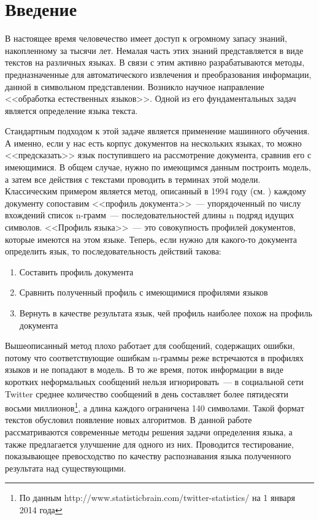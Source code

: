 \documentclass[a4paper, 14pt]{article}
\begin{document}
\pagebreak

\newtheorem{definition} {Определение}
\newtheorem{option} {Свойство}
\newtheorem{theorem} {Теорема}

\section*{Введение}

	        В настоящее время человечество имеет доступ к огромному запасу знаний, накопленному за тысячи лет. Немалая часть этих знаний представляется
	        в виде текстов на различных языках. В связи с этим активно разрабатываются методы, предназначенные для автоматического извлечения
	        и преобразования информации, данной в символьном представлении. 
	        Возникло научное направление <<обработка естественных языков>>. Одной из его фундаментальных задач является определение языка текста. 

	
	        Стандартным подходом к этой задаче является применение машинного обучения. А именно, если у нас есть корпус документов 
	        на нескольких языках, то можно <<предсказать>> язык поступившего на рассмотрение документа, сравнив его с имеющимися. 
	        В общем случае, нужно по имеющимся данным построить модель, а затем все действия с текстами проводить в терминах 
	        этой модели. 
	        Классическим примером является метод, описанный в 1994 году (см. \cite{canvar}) каждому документу сопоставим <<профиль документа>>~--- упорядоченный по
	        числу вхождений список n-грамм~--- последовательностей длины n подряд идущих символов. <<Профиль языка>>~--- это совокупность профилей
	        документов, которые имеются на этом языке. Теперь, если нужно для какого-то документа определить язык, то последовательность
	        действий такова:
	        \begin{enumerate}
	        		\item Составить профиль документа
	        		\item Сравнить полученный профиль с имеющимися профилями языков
	        		\item Вернуть в качестве результата язык, чей профиль наиболее похож на профиль документа
	        \end{enumerate}
	          
	        Вышеописанный метод плохо работает для сообщений, содержащих ошибки, потому что соответствующие ошибкам n-граммы реже встречаются в профилях языков и не попадают в модель. В то же время, поток информации в виде коротких неформальных сообщений нельзя игнорировать~---
	        в социальной сети Twitter среднее количество сообщений в день составляет более пятидесяти восьми миллионов\footnote{По данным http://www.statisticbrain.com/twitter-statistics/ на 1 января 2014 года}, а длина каждого ограничена 140 символами. 
	        Такой формат текстов обусловил появление новых алгоритмов. В данной работе рассматриваются современные методы 
	        решения задачи определения языка, а также предлагается улучшение для одного из них. Проводится тестирование, показывающее
	        превосходство по качеству распознавания языка полученного результата над существующими.
  
\end{document}
